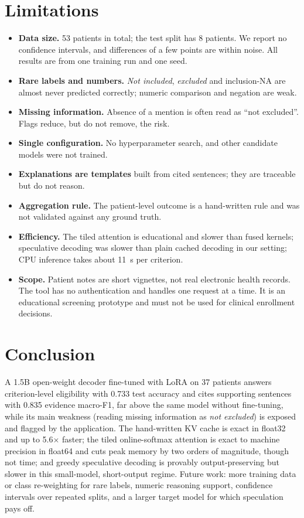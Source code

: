 \documentclass[conference]{IEEEtran}
\begin{document}
\section{Limitations}
\begin{itemize}
\item \textbf{Data size.} 53 patients in total; the test split has 8 patients. We report no confidence intervals, and differences of a few points are within noise. All results are from one training run and one seed.
\item \textbf{Rare labels and numbers.} \emph{Not included}, \emph{excluded} and inclusion-NA are almost never predicted correctly; numeric comparison and negation are weak.
\item \textbf{Missing information.} Absence of a mention is often read as ``not excluded''. Flags reduce, but do not remove, the risk.
\item \textbf{Single configuration.} No hyperparameter search, and other candidate models were not trained.
\item \textbf{Explanations are templates} built from cited sentences; they are traceable but do not reason.
\item \textbf{Aggregation rule.} The patient-level outcome is a hand-written rule and was not validated against any ground truth.
\item \textbf{Efficiency.} The tiled attention is educational and slower than fused kernels; speculative decoding was slower than plain cached decoding in our setting; CPU inference takes about 11~s per criterion.
\item \textbf{Scope.} Patient notes are short vignettes, not real electronic health records. The tool has no authentication and handles one request at a time. It is an educational screening prototype and must not be used for clinical enrollment decisions.
\end{itemize}

\section{Conclusion}
A 1.5B open-weight decoder fine-tuned with LoRA on 37 patients answers criterion-level eligibility with 0.733 test accuracy and cites supporting sentences with 0.835 evidence macro-F1, far above the same model without fine-tuning, while its main weakness (reading missing information as \emph{not excluded}) is exposed and flagged by the application. The hand-written KV cache is exact in float32 and up to 5.6$\times$ faster; the tiled online-softmax attention is exact to machine precision in float64 and cuts peak memory by two orders of magnitude, though not time; and greedy speculative decoding is provably output-preserving but slower in this small-model, short-output regime. Future work: more training data or class re-weighting for rare labels, numeric reasoning support, confidence intervals over repeated splits, and a larger target model for which speculation pays off.
\end{document}
